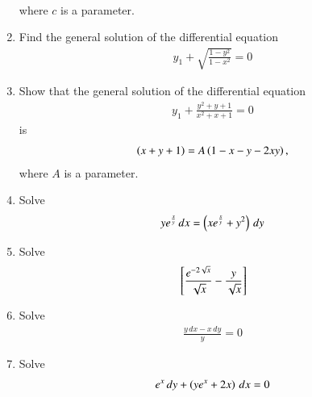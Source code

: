 \begin{enumerate}[label=\arabic*.,ref=\thesubsection.\theenumi]
\begin{align}
\end{align}
%
where $c$ is a parameter.
%
\item Find the general solution of the differential equation
%
\begin{align}
y_1 +\sqrt{\frac{1-y^2}{1-x^2}} = 0
\end{align}
%
\item Show that the general solution of the differential equation
%
\begin{align}
y_1 +\frac{y^2+y+1}{x^2+x+1} = 0
\end{align}
%
is 
%
\begin{align}
\left(x+y+1\right) = A\left(1-x-y-2xy\right), 
\end{align}
%
where $A$ is a parameter.
\item Solve
%
\begin{align}
ye^{\frac{x}{y}}\, dx = \left(xe^{\frac{x}{y}}+y^2\right)\, dy
\end{align}
%
\item Solve
%
\begin{align}
{}\left[
\frac{
e^{-2\sqrt{x}}
}
{
\sqrt{x}
}
-
\frac{y}{\sqrt{x}}
\right]
\end{align}
%
%
\item Solve
%
\begin{align}
\frac{y\, dx - x \, dy}{y} = 0
\end{align}
%
\item Solve
%
\begin{align}
e^{x}\, dy + \left(ye^{x}+2x\right)\, dx = 0
\end{align}
\end{enumerate}
